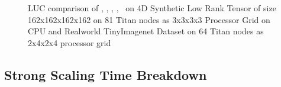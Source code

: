 \begin{figure}
\caption{LUC comparison of \MU, \HALS, \BPP, \ADMM, \Nestrov\ on 4D Synthetic Low Rank Tensor of size 162x162x162x162 on 81 Titan nodes as 3x3x3x3 Processor Grid on CPU and Realworld TinyImagenet Dataset on 64 Titan nodes as 2x4x2x4 processor grid}
\label{fig:luccomp}
\end{figure}

\subsection{Strong Scaling Time Breakdown}

